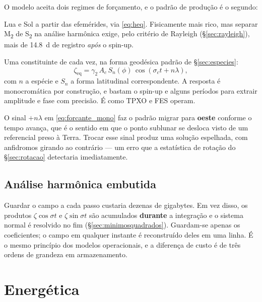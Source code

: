 \documentclass[11pt,a4paper,oneside]{report}
\theoremstyle{definition}
\theoremstyle{plain}
\theoremstyle{remark}
\begin{document}
O modelo aceita dois regimes de forçamento, e o padrão de produção é o segundo:

\begin{description}[style=nextline,leftmargin=0.8cm]
\item[Astronômico] Lua e Sol a partir das efemérides, via \eqref{eq:heq}.
  Fisicamente mais rico, mas separar M\textsubscript{2} de S\textsubscript{2}
  na análise harmônica exige, pelo critério de Rayleigh
  (\S\ref{sec:rayleigh}), mais de \SI{14.8}{\day} de registro \emph{após} o
  spin-up.
\item[Monocromático] Uma constituinte de cada vez, na forma geodésica padrão de
  \S\ref{sec:especies}:
  \begin{equation}
  \zeta_{\text{eq}}=\gamma_2\,A_c\,S_{n}(\phi)\,
  \cos\!\left(\sigma_c t+n\lambda\right),
  \label{eq:forcante_mono}
  \end{equation}
  com $n$ a espécie e $S_n$ a forma latitudinal correspondente. A resposta é
  monocromática por construção, e bastam o spin-up e alguns períodos para
  extrair amplitude e fase com precisão. É como TPXO e FES operam.
\end{description}

O sinal $+n\lambda$ em \eqref{eq:forcante_mono} faz o padrão migrar para
\textbf{oeste} conforme o tempo avança, que é o sentido em que o ponto sublunar
se desloca visto de um referencial preso à Terra. Trocar esse sinal produz uma
solução espelhada, com anfidromos girando ao contrário — um erro que a
estatística de rotação do \S\ref{sec:rotacao} detectaria imediatamente.

\subsection{Análise harmônica embutida}
\label{sec:embutida}

Guardar o campo a cada passo custaria dezenas de gigabytes. Em vez disso, os
produtos $\zeta\cos\sigma t$ e $\zeta\sin\sigma t$ são acumulados
\textbf{durante} a integração e o sistema normal é resolvido no fim
(\S\ref{sec:minimosquadrados}). Guardam-se apenas os coeficientes; o campo em
qualquer instante é reconstruído deles em uma linha. É o mesmo princípio dos
modelos operacionais, e a diferença de custo é de três ordens de grandeza em
armazenamento.

\section{Energética}
\label{sec:energia}
\end{document}

